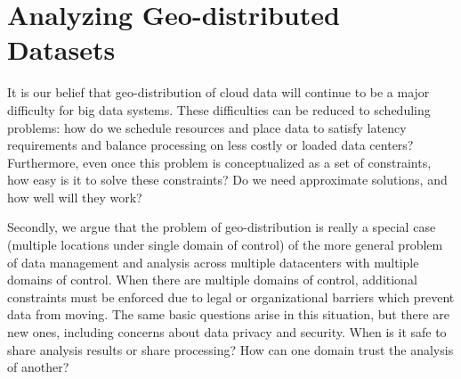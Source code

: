 \section{Analyzing Geo-distributed Datasets}
It is our belief that geo-distribution of cloud data will continue to be a major difficulty for big data systems. These difficulties can be reduced to scheduling problems: how do we schedule resources and place data to satisfy latency requirements and balance processing on less costly or loaded data centers? Furthermore, even once this problem is conceptualized as a set of constraints, how easy is it to solve these constraints? Do we need approximate solutions, and how well will they work?

Secondly, we argue that the problem of geo-distribution is really a special case (multiple locations under single domain of control) of the more general problem of data management and analysis across multiple datacenters with multiple domains of control. When there are multiple domains of control, additional constraints must be enforced due to legal or organizational barriers which prevent data from moving. The same basic questions arise in this situation, but there are new ones, including concerns about data privacy and security. When is it safe to share analysis results or share processing? How can one domain trust the analysis of another?
